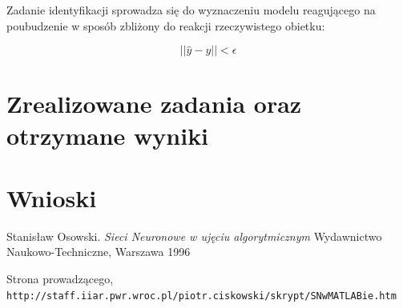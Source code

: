 \documentclass{article}
\begin{document}
Zadanie identyfikacji sprowadza się do wyznaczeniu modelu reagującego na poubudzenie w sposób zbliżony do reakcji rzeczywistego obietku:

\begin{equation}
	|| \hat{y} - y || < \epsilon
\end{equation}

\section{Zrealizowane zadania oraz otrzymane wyniki}


\section{Wnioski}



\newpage
\begin{thebibliography}{9}

Stanisław Osowski.
\textit{Sieci Neuronowe w ujęciu algorytmicznym}
Wydawnictwo Naukowo-Techniczne, Warszawa 1996

Strona prowadzącego,
\\\texttt{http://staff.iiar.pwr.wroc.pl/piotr.ciskowski/skrypt/SNwMATLABie.htm}

\end{thebibliography}
\end{document}
